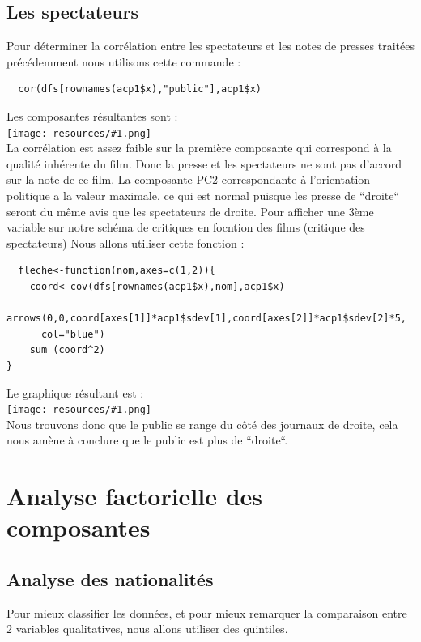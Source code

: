 \documentclass{report}
\newcommand{\photo}[1]{\\
    \texttt{[image: resources/\#1.png]}
\\
}
\begin{document}
\subsection{Les spectateurs}
Pour déterminer la corrélation entre les spectateurs et les notes de presses traitées précédemment nous utilisons
cette commande :
\begin{verbatim}
  cor(dfs[rownames(acp1$x),"public"],acp1$x)
\end{verbatim}
Les composantes résultantes sont :
\photo{14}
La corrélation est assez faible sur la première composante qui correspond à la qualité inhérente du film.
Donc la presse et les spectateurs ne sont pas d'accord sur la note de ce film. La composante PC2 correspondante
à l'orientation politique a la valeur maximale, ce qui est normal puisque les presse de ``droite`` seront
du même avis que les spectateurs de droite.
Pour afficher une 3ème variable sur notre schéma de critiques en focntion des films (critique des spectateurs)
Nous allons utiliser cette fonction :
\begin{verbatim}
  fleche<-function(nom,axes=c(1,2)){
    coord<-cov(dfs[rownames(acp1$x),nom],acp1$x)
    arrows(0,0,coord[axes[1]]*acp1$sdev[1],coord[axes[2]]*acp1$sdev[2]*5,
      col="blue")
    sum (coord^2)
}
\end{verbatim}
Le graphique résultant est :
\photo{15}
Nous trouvons donc que le public se range du côté des journaux de droite, cela nous amène à conclure
que le public est plus de ``droite``.
\newpage
\section{Analyse factorielle des composantes}
\subsection{Analyse des nationalités}
Pour mieux classifier les données, et pour mieux remarquer la comparaison entre 2 variables qualitatives, nous
allons utiliser des quintiles.
\end{document}
